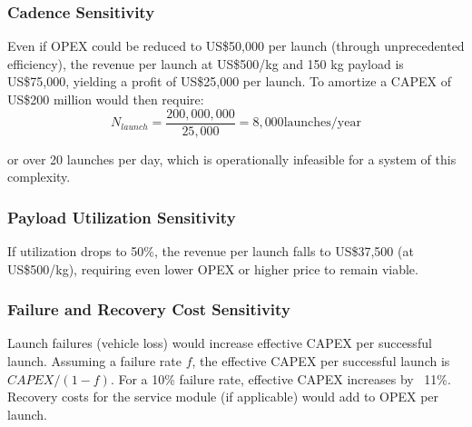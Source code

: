 \subsubsection{Cadence Sensitivity}
Even if OPEX could be reduced to US\$50,000 per launch (through unprecedented efficiency), the revenue per launch at US\$500/kg and 150 kg payload is US\$75,000, yielding a profit of US\$25,000 per launch. To amortize a CAPEX of US\$200 million would then require:
\begin{equation}
N_{launch} = \frac{200{,}000{,}000}{25{,}000} = 8{,}000  \text{launches/year}
\end{equation}

or over 20 launches per day, which is operationally infeasible for a system of this complexity.

\subsubsection{Payload Utilization Sensitivity}
If utilization drops to 50\%, the revenue per launch falls to US\$37,500 (at US\$500/kg), requiring even lower OPEX or higher price to remain viable.

\subsubsection{Failure and Recovery Cost Sensitivity}
Launch failures (vehicle loss) would increase effective CAPEX per successful launch. Assuming a failure rate $f$, the effective CAPEX per successful launch is $CAPEX / (1-f)$. For a 10\% failure rate, effective CAPEX increases by ~11\%. Recovery costs for the service module (if applicable) would add to OPEX per launch.

